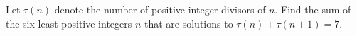 Let $\tau (n)$ denote the number of positive integer divisors of $n$. Find the sum of the six least positive integers $n$ that are solutions to $\tau (n) + \tau (n+1) = 7$.